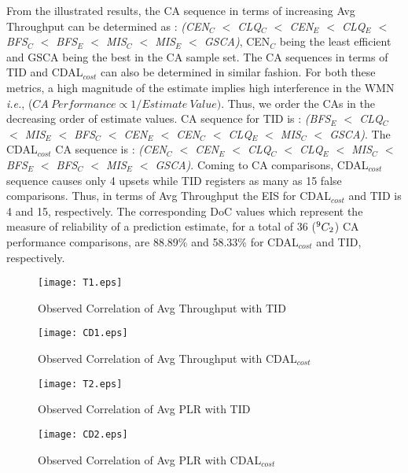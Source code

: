 \documentclass[conference]{IEEEtran}
\begin{document}
From the illustrated results, the CA sequence in terms of increasing Avg Throughput can be determined as : \textit{(CEN$_C$ $<$ CLQ$_C$ $<$ CEN$_E$ $<$ CLQ$_E$ $<$ BFS$_C$ $<$ BFS$_E$ $<$ MIS$_C$ $<$ MIS$_E$ $<$ GSCA)}, CEN$_C$ being the least efficient and GSCA being the best in the CA sample set. The CA sequences in terms of TID and CDAL$_{cost}$ can also be determined in similar fashion. For both these metrics, a high magnitude of the estimate implies high interference in the WMN \emph{i.e.}, ($CA \ Performance \propto 1/Estimate \ Value)$. Thus, we order the CAs in the decreasing order of estimate values. CA sequence for TID is : \textit{(BFS$_E$ $<$ CLQ$_C$ $<$ MIS$_E$ $<$ BFS$_C$ $<$ CEN$_E$ $<$ CEN$_C$ $<$ CLQ$_E$ $<$ MIS$_C$ $<$ GSCA)}. The CDAL$_{cost}$ CA sequence is :  \textit{(CEN$_C$ $<$ CEN$_E$ $<$ CLQ$_C$ $<$ CLQ$_E$ $<$ MIS$_C$ $<$ BFS$_E$ $<$ BFS$_C$ $<$ MIS$_E$ $<$ GSCA)}. Coming to CA comparisons, CDAL$_{cost}$ sequence causes only 4 upsets while TID registers as many as 15 false 
comparisons. Thus, in terms of Avg Throughput the EIS for CDAL$_{cost}$ and TID is 4 and 15, respectively. The corresponding DoC values which represent the measure of reliability of a prediction estimate, for a total of 36 ($\textsuperscript 9 C_2$) CA performance comparisons, are 88.89\% and 58.33\% for CDAL$_{cost}$ and TID, respectively. 
 \begin{figure}[htb!]
                \centering
                \texttt{[image: T1.eps]}
                \caption{Observed Correlation of Avg Throughput with TID} 
                \label{TIDX1}
        \end{figure} 
    \begin{figure}[htb!]
	    \centering
	    \texttt{[image: CD1.eps]}
	    \caption{Observed Correlation of Avg Throughput with CDAL$_{cost}$} 
	    \label{TIDX2}
    \end{figure} 

\begin{figure}[htb!]
                \centering
                \texttt{[image: T2.eps]}
                \caption{Observed Correlation of Avg PLR with TID} 
                \label{TIDX3}
        \end{figure} 
    \begin{figure}[htb!]
	    \centering
	    \texttt{[image: CD2.eps]}
	    \caption{Observed Correlation of Avg PLR with CDAL$_{cost}$} 
	    \label{TIDX4}
    \end{figure}
    
\end{document}
